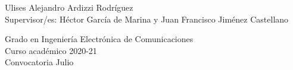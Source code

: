 \begin{center}
   \vspace{1.2cm}

  Ulises Alejandro Ardizzi Rodríguez\\

   \vspace{1.2cm}
  Supervisor/es: Héctor García de Marina y Juan Francisco Jiménez Castellano
  
  \vspace{2cm}
  Grado en Ingeniería Electrónica de Comunicaciones\\
  Curso académico 2020-21\\
  Convocatoria Julio\\



\end{center}




